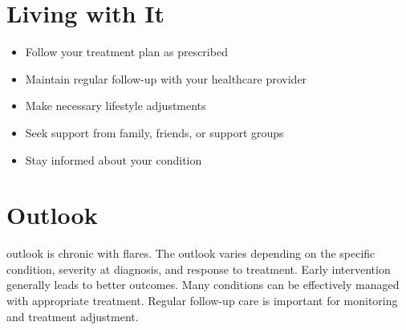\section{Living with It}
\begin{itemize}[noitemsep]
  \item Follow your treatment plan as prescribed
  \item Maintain regular follow-up with your healthcare provider
  \item Make necessary lifestyle adjustments
  \item Seek support from family, friends, or support groups
  \item Stay informed about your condition
\end{itemize}
\section{Outlook}
outlook is chronic with flares. The outlook varies depending on the specific condition, severity at diagnosis, and response to treatment. Early intervention generally leads to better outcomes. Many conditions can be effectively managed with appropriate treatment. Regular follow-up care is important for monitoring and treatment adjustment.
